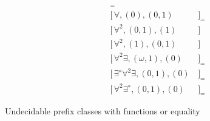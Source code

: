 \begin{table}[hbt]
	\begin{align*}
	[\,\forall, (0), (2)&\,]_{=} \tag{Gurevich 1976}
	\\
	[\,\forall, (0), (0, 1)&\,]_{=} \tag{Gurevich 1976}
	\\
	[\,\forall^2 , (0, 1), (1)&\,] \tag{Gurevich 1969}
	\\
	[\,\forall^2 , (1), (0, 1)&\,] \tag{Gurevich 1969}
	\\
	[\,\forall^2\exists, (\omega, 1), (0)&\,]_{=} \tag{Goldfarb 1984}
	\\
	[\,\exists^{∗}\forall^2\exists, (0, 1), (0)&\,]_{=} \tag{Goldfarb 1984}
	\\
	[\,\forall^2\exists^{∗}, (0, 1), (0)&\,]_{=} \tag{Goldfarb 1984}
	\end{align*}
	\caption{Undecidable prefix classes with functions or equality}
	\label{tab:undecidable:FunctionsAndEquations}
\end{table}


